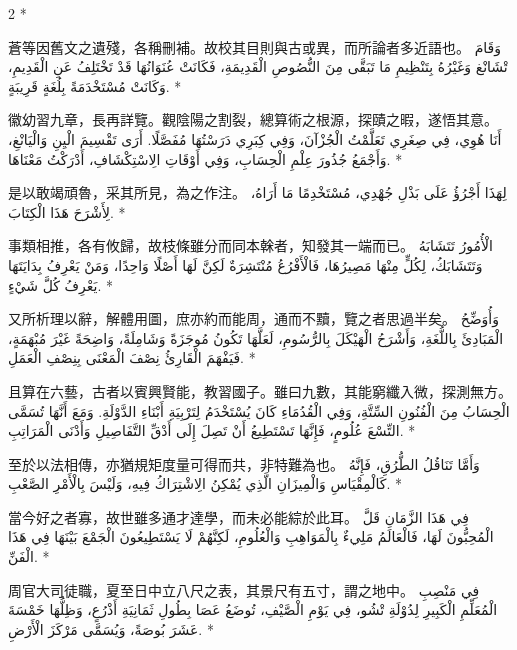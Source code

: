 \documentclass[11pt,a4paper]{article}
\newcommand{\ar}[1]{\arabicfont\beginR #1\endR}
\newenvironment{bilingual}{%
  \begin{paracol}{2}%
  \switchcolumn[0]*%
}{%
  \end{paracol}%
}
\newcommand{\cnline}[1]{\switchcolumn[0]\noindent #1 \switchcolumn[1]}
\newcommand{\arline}[1]{\noindent\ar{#1} \switchcolumn[0]*}
\newenvironment{prob bilingual}{%
  \begin{paracol}{2}%
  \switchcolumn[0]*%
}{%
  \end{paracol}%
  \vspace{0.3em}%
}
\begin{document}
\begin{bilingual}
\cnline{%
蒼等因舊文之遺殘，各稱刪補。故校其目則與古或異，而所論者多近語也。
}
\arline{%
وَقَامَ تْشَانْغ وَغَيْرُهُ بِتَنْظِيمِ مَا تَبَقَّى مِنَ النُّصُوصِ الْقَدِيمَةِ، فَكَانَتْ عُنَوَانُهَا قَدْ تَخْتَلِفُ عَنِ الْقَدِيمِ، وَكَانَتْ مُسْتَخْدَمَةً بِلُغَةٍ قَرِيبَةٍ.
}

\cnline{%
徽幼習九章，長再詳覽。觀陰陽之割裂，總算術之根源，探賾之暇，遂悟其意。
}
\arline{%
أَنَا هُوِي، فِي صِغَرِي تَعَلَّمْتُ الْجُزْآنَ، وَفِي كِبَرِي دَرَسْتُهَا مُفَصَّلًا. أَرَى تَقْسِيمَ الْيِنِ وَالْيَانْغِ، وَأَجْمَعُ جُذُورَ عِلْمِ الْحِسَابِ، وَفِي أَوْقَاتِ الِاسْتِكْشَافِ، أَدْرَكْتُ مَعْنَاهَا.
}

\cnline{%
是以敢竭頑魯，采其所見，為之作注。
}
\arline{%
لِهَذَا أَجْرُؤُ عَلَى بَذْلِ جُهْدِي، مُسْتَخْدِمًا مَا أَرَاهُ، لِأَشْرَحَ هَذَا الْكِتَابَ.
}

\cnline{%
事類相推，各有攸歸，故枝條雖分而同本榦者，知發其一端而已。
}
\arline{%
الْأُمُورُ تَتَشَابَهُ وَتَتَشَابَكُ، لِكُلٍّ مِنْهَا مَصِيرُهَا، فَالْأَفْرُعُ مُنْتَشِرَةٌ لَكِنَّ لَهَا أَصْلًا وَاحِدًا، وَمَنْ يَعْرِفُ بِدَايَتَهَا يَعْرِفُ كُلَّ شَيْءٍ.
}

\cnline{%
又所析理以辭，解體用圖，庶亦約而能周，通而不黷，覽之者思過半矣。
}
\arline{%
وَأُوَضِّحُ الْمَبَادِئَ بِاللُّغَةِ، وَأَشْرَحُ الْهَيْكَلَ بِالرُّسُومِ، لَعَلَّهَا تَكُونُ مُوجَزَةً وَشَامِلَةً، وَاضِحَةً غَيْرَ مُبْهَمَةٍ، فَيَفْهَمَ الْقَارِئُ نِصْفَ الْمَعْنَى بِنِصْفِ الْعَمَلِ.
}

\cnline{%
且算在六藝，古者以賓興賢能，教習國子。雖曰九數，其能窮纖入微，探測無方。
}
\arline{%
الْحِسَابُ مِنَ الْفُنُونِ السِّتَّةِ، وَفِي الْقُدُمَاءِ كَانَ يُسْتَخْدَمُ لِتَرْبِيَةِ أَبْنَاءِ الدَّوْلَةِ. وَمَعَ أَنَّهَا تُسَمَّى التِّسْعَ عُلُومٍ، فَإِنَّهَا تَسْتَطِيعُ أَنْ تَصِلَ إِلَى أَدْقِّ التَّفَاصِيلِ وَأَدْنَى الْمَرَاتِبِ.
}

\cnline{%
至於以法相傳，亦猶規矩度量可得而共，非特難為也。
}
\arline{%
وَأَمَّا تَنَاقُلُ الطُّرُقِ، فَإِنَّهُ كَالْمِقْيَاسِ وَالْمِيزَانِ الَّذِي يُمْكِنُ الِاشْتِرَاكُ فِيهِ، وَلَيْسَ بِالْأَمْرِ الصَّعْبِ.
}

\cnline{%
當今好之者寡，故世雖多通才達學，而未必能綜於此耳。
}
\arline{%
فِي هَذَا الزَّمَانِ قَلَّ الْمُحِبُّونَ لَهَا، فَالْعَالَمُ مَلِيءٌ بِالْمَوَاهِبِ وَالْعُلُومِ، لَكِنَّهُمْ لَا يَسْتَطِيعُونَ الْجَمْعَ بَيْنَهَا فِي هَذَا الْفَنِّ.
}

\cnline{%
周官大司徒職，夏至日中立八尺之表，其景尺有五寸，謂之地中。
}
\arline{%
فِي مَنْصِبِ الْمُعَلِّمِ الْكَبِيرِ لِدُوْلَةِ تْشُو، فِي يَوْمِ الْصَّيْفِ، تُوضَعُ عَصَا بِطُولِ ثَمَانِيَةِ أَذْرُعٍ، وَظِلُّهَا خَمْسَةَ عَشَرَ بُوصَةً، وَيُسَمَّى مَرْكَزَ الْأَرْضِ.
}


\end{bilingual}
\end{document}
